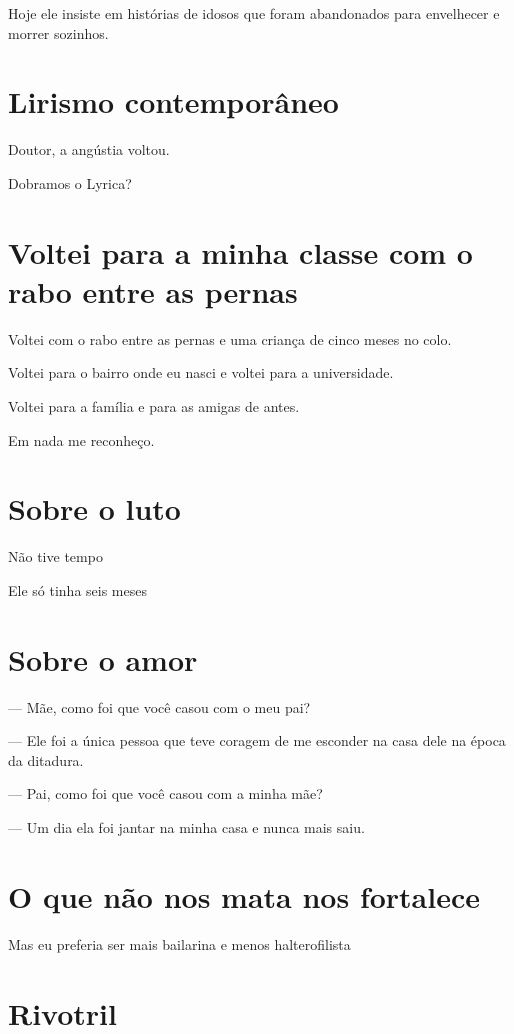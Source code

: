 {{Hoje ele insiste em histórias de idosos que foram abandonados para
envelhecer e morrer sozinhos.


\chapter{Lirismo contemporâneo}\label{lirismo-contemporuxe2neo}

{\noindent
Doutor, a angústia voltou.

Dobramos o Lyrica?}

\chapter{Voltei para a minha classe com o rabo entre as pernas}

Voltei com o rabo entre as pernas e uma criança de cinco meses no colo.

Voltei para o bairro onde eu nasci e voltei para a universidade.

Voltei para a família e para as amigas de antes.

Em nada me reconheço.

\chapter{Sobre o luto}

{\parindent0pt\parskip1pt
Não tive tempo

Ele só tinha seis meses
}

\chapter{Sobre o amor}\label{sobre-o-amor}

--- Mãe, como foi que você casou com o meu pai?

--- Ele foi a única pessoa que teve coragem de me esconder na casa dele
na época da ditadura.

--- Pai, como foi que você casou com a minha mãe?

--- Um dia ela foi jantar na minha casa e nunca mais saiu.

\chapter{O que não nos mata nos fortalece}

Mas eu preferia ser mais bailarina e menos halterofilista


\chapter{Rivotril}

}}
